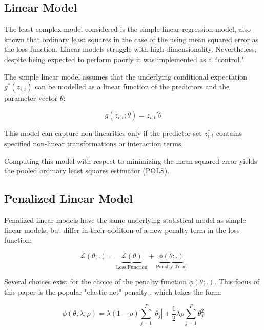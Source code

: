 \documentclass[a4paper]{article}
\begin{document}
	\subsection{Linear Model}
	
	The least complex model considered is the simple linear regression model, also known that ordinary least squares in the case of the using mean squared error as the loss function. Linear models struggle with high-dimensionality. Nevertheless, despite being expected to perform poorly it was implemented as a ``control."
	
	The simple linear model assumes that the underlying conditional expectation \( g^*(z_{i, t}) \) can be modelled as a linear function of the predictors and the parameter vector \( \theta \):
	
	\begin{equation}
	g(z_{i, t};\theta) = z_{i, t}' \theta
	\end{equation}
	
	This model can capture non-linearities only if the predictor set \(z^*_{i, t}\) contains specified non-linear transformations or interaction terms. 
	
	Computing this model with respect to minimizing the mean squared error yields the pooled ordinary least squares estimator (POLS).
	
	\subsection{Penalized Linear Model}
	
	Penalized linear models have the same underlying statistical model as simple linear models, but differ in their addition of a new penalty term in the loss function:
	
	\begin{equation}
		\mathcal{L(\theta;.)} = 
		\underset{\text{Loss Function}}{\underbrace{\mathcal{L(\theta)}}} + 
		\underset{\text{Penalty Term}}{\underbrace{\phi(\theta;.)}}
	\end{equation}
	
	Several choices exist for the choice of the penalty function \( \phi(\theta;.) \). This focus of this paper is the popular "elastic net" penalty  \citep{zou_regularization_2005}, which takes the form:
	
	\begin{equation}
		\phi(\theta;\lambda,\rho) = 
		\lambda(1-\rho) \sum_{j = 1}^{P}|\theta_j| +
		\frac{1}{2} \lambda \rho \sum_{j = 1}^{P}\theta_j^2
	\end{equation}
	
\end{document}
